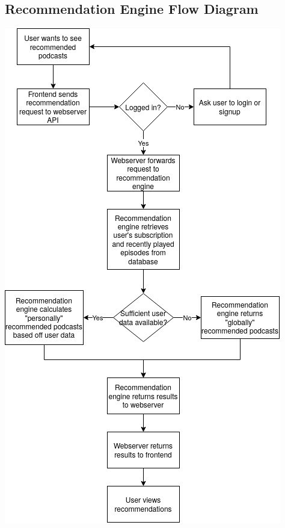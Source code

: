 \documentclass[12pt]{article}
\begin{document}
\begin{appendices}
    \section{Recommendation Engine Flow Diagram} \label{app:recommendation_engine_flowchart}
    \begin{center}
        \includegraphics[height=0.5\paperheight]{resources/recommendation_engine}
    \end{center}

\end{appendices}
\end{document}
